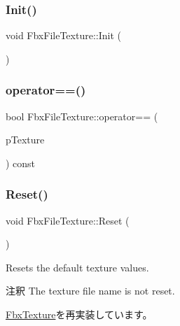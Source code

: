 \subsubsection{\texorpdfstring{Init()}{Init()}}
{\footnotesize\ttfamily void Fbx\+File\+Texture\+::\+Init (\begin{DoxyParamCaption}{ }\end{DoxyParamCaption})\hspace{0.3cm}{\ttfamily [protected]}}

\mbox{\label{class_fbx_file_texture_ab2c5320676da40e302a20ef30326d11a}} 
\subsubsection{\texorpdfstring{operator==()}{operator==()}}
{\footnotesize\ttfamily bool Fbx\+File\+Texture\+::operator== (\begin{DoxyParamCaption}\item[{\hyperlink{class_fbx_file_texture}{Fbx\+File\+Texture} const \&}]{p\+Texture }\end{DoxyParamCaption}) const}

\mbox{\label{class_fbx_file_texture_acc5d7a39640e4f7f0923c1620c473cb6}} 
\subsubsection{\texorpdfstring{Reset()}{Reset()}}
{\footnotesize\ttfamily void Fbx\+File\+Texture\+::\+Reset (\begin{DoxyParamCaption}{ }\end{DoxyParamCaption})\hspace{0.3cm}{\ttfamily [virtual]}}

Resets the default texture values. \begin{DoxyRemark}{注釈}
The texture file name is not reset. 
\end{DoxyRemark}


\hyperlink{class_fbx_texture_a9ba254e02e13f1cae91295c996ed7fcb}{Fbx\+Texture}を再実装しています。

\mbox{\label{class_fbx_file_texture_a82e450fd46559fc4c78ca6f0d593b837}} 
